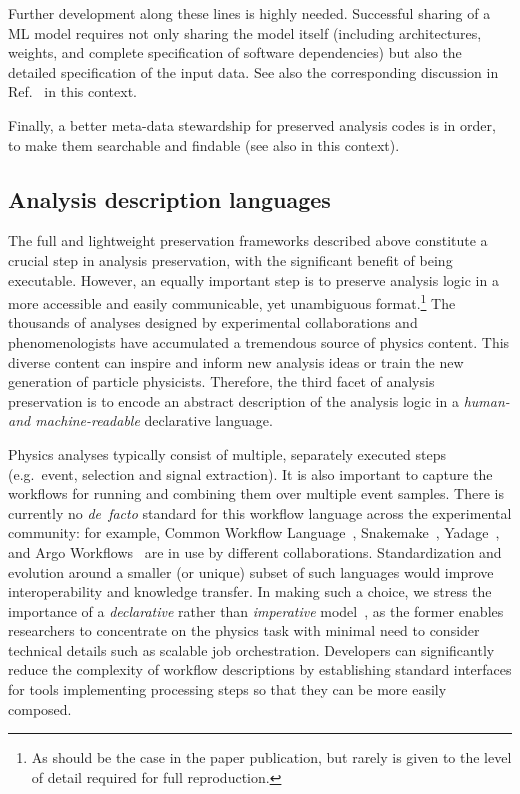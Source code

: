 \documentclass[11pt]{article}
\begin{document}
Further development along these lines is highly needed. Successful sharing of a \gls{ML} model requires not only sharing the model itself (including architectures, weights, and complete specification of software dependencies) but also the detailed specification of the input data. See also the corresponding discussion in Ref.~\cite{snowmass:MLevts} in this context.

Finally, a better meta-data stewardship for preserved analysis codes is in order, to make them searchable and findable (see also  in this context).

\subsection{Analysis description languages}

The full and lightweight preservation frameworks described above constitute a crucial step in analysis preservation, with the significant benefit of being executable.  
However, an equally important step is to preserve %
analysis logic in a more accessible and easily communicable, yet unambiguous format.\footnote{As should be the case in the paper publication, but rarely is given to the level of detail required for full reproduction.}
The thousands of analyses designed by experimental collaborations and phenomenologists have accumulated a tremendous source of physics content. This diverse content can inspire and inform new analysis ideas or train the new generation of particle physicists. %
Therefore, the third facet of \gls{analysis preservation} is to encode an abstract description of the analysis logic in a \emph{human- and machine-readable} declarative language. 

Physics analyses typically consist of multiple, separately executed steps (e.g.~event, selection and signal extraction). It is also important to capture the workflows for running and combining them over multiple event samples. There is currently no \emph{de~facto} standard for this workflow language across the experimental community: for example, Common Workflow Language~\cite{CWL}, Snakemake~\cite{SnakeMake}, Yadage~\cite{Cranmer:2017frf,yadage_code}, and Argo Workflows~\cite{argo} are in use by different collaborations. Standardization and evolution around a smaller (or unique) subset of such languages would improve interoperability and knowledge transfer. In making such a choice, we stress the importance of a \textsl{declarative} rather than \textsl{imperative} model~\cite{10.3389/fdata.2021.661501}, as the former enables researchers to concentrate on the physics task with minimal need to consider technical details such as scalable job orchestration. Developers can significantly reduce the complexity of workflow descriptions by establishing standard interfaces for tools implementing processing steps so that they can be more easily composed.
\end{document}

